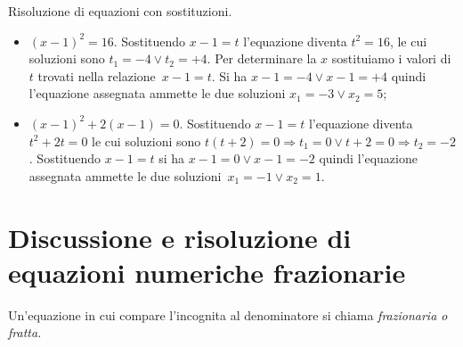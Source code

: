 \begin{exrig}
\begin{esempio}
Risoluzione di equazioni con sostituzioni.
\begin{itemize}
\item $( x - 1 )^{2} = 16$. Sostituendo $x - 1 = t$ l'equazione diventa $t^{2} = 16$, le cui soluzioni sono $t_{1} = - 4 \vee t_{2} = + 4$. Per determinare la $x$ sostituiamo i valori di $t$ trovati nella relazione~$x - 1 = t$. Si ha $x - 1 = - 4 \vee x - 1 = + 4$ quindi l’equazione assegnata ammette le due soluzioni
$x_{1} = - 3 \vee x_{2} = 5$;
\item $( x - 1 )^{2} + 2 ( x - 1 ) = 0$. Sostituendo $x - 1 = t$ l'equazione diventa $t^{2} + 2t = 0$ le cui soluzioni sono $t ( t + 2 ) = 0 \Rightarrow t_{1} = 0 \vee t + 2 = 0 \Rightarrow t_{2} = - 2$. Sostituendo $x - 1 = t$ si ha $x - 1 = 0 \vee x - 1 = - 2$ quindi l’equazione assegnata ammette le due soluzioni~$x_{1} = - 1 \vee x_{2} = 1$.
\end{itemize}
\end{esempio}
\end{exrig}
\vspazio\ovalbox{\risolvii \ref{ese:3.36}, \ref{ese:3.37}, \ref{ese:3.38}}

\section{Discussione e risoluzione di equazioni numeriche frazionarie}
Un’equazione in cui compare l’incognita al denominatore si chiama \emph{frazionaria o fratta.}

